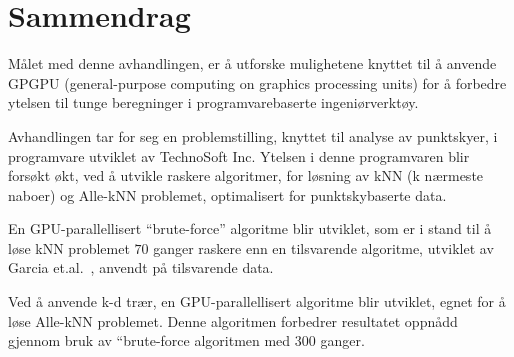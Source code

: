 
\section*{Sammendrag}


M{\aa}let med denne avhandlingen, er {\aa} utforske mulighetene knyttet til {\aa} anvende GPGPU (general-purpose computing on graphics processing units) for {\aa} forbedre ytelsen til tunge beregninger i programvarebaserte ingeni{\o}rverkt{\o}y.

Avhandlingen tar for seg en problemstilling, knyttet til analyse av punktskyer, i programvare utviklet av TechnoSoft Inc. Ytelsen i denne programvaren blir fors{\o}kt {\o}kt, ved {\aa} utvikle raskere algoritmer, for l{\o}sning av kNN (k n{\ae}rmeste naboer) og Alle-kNN problemet, optimalisert for punktskybaserte data.

En GPU-parallellisert “brute-force” algoritme blir utviklet, som er i stand til {\aa} l{\o}se kNN problemet $70$ ganger raskere enn en tilsvarende algoritme, utviklet av Garcia et.al\@.~\cite{Garcia2008}, anvendt p{\aa} tilsvarende data.

Ved {\aa} anvende k-d tr{\ae}r, en GPU-parallellisert algoritme blir utviklet, egnet for {\aa} l{\o}se Alle-kNN problemet. Denne algoritmen forbedrer resultatet oppn{\aa}dd gjennom bruk av “brute-force algoritmen med 300 ganger.


\clearpage\
